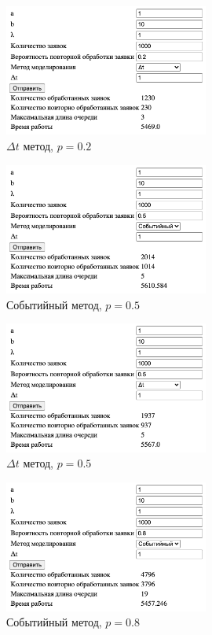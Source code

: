 \begin{figure}[H]
    \centering
    \includegraphics[width=0.6\textwidth]{img/content/dt_2.png}
    \caption{$\Delta t$ метод, $p = 0.2$}
\end{figure}

\begin{figure}[H]
    \centering
    \includegraphics[width=0.6\textwidth]{img/content/event_5.png}
    \caption{Событийный метод, $p = 0.5$}
\end{figure}

\begin{figure}[H]
    \centering
    \includegraphics[width=0.6\textwidth]{img/content/dt_5.png}
    \caption{$\Delta t$ метод, $p = 0.5$}
\end{figure}

\begin{figure}[H]
    \centering
    \includegraphics[width=0.6\textwidth]{img/content/event_8.png}
    \caption{Событийный метод, $p = 0.8$}
\end{figure}

